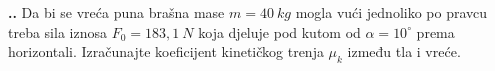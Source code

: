 

\noindent 
\textbf{
\thecjelina.\thezadatak.}
Da bi se vreća puna brašna mase $m=40\ kg$ mogla vući jednoliko po pravcu treba sila iznosa $F_0=183,1\ N$ koja djeluje pod kutom od $\alpha=10^\circ$ prema horizontali. Izračunajte koeficijent kinetičkog trenja $\mu_k$ između tla i vreće. 
